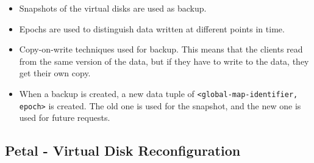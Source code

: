 \documentclass[parskip=half]{scrartcl}
\begin{document}
        \begin{itemize}
            \item 
            Snapshots of the virtual disks are used as backup.
            \item 
            Epochs are used to distinguish data written at different points in time.
            \item 
            Copy-on-write techniques used for backup. This means that the clients read from the same version of the data, but if they have to write to the data, they get their own copy.
            \item 
            When a backup is created, a new data tuple of \texttt{<global-map-identifier, epoch>} is created. The old one is used for the snapshot, and the new one is used for future requests.
        \end{itemize}
    

    \subsection{Petal - Virtual Disk Reconfiguration} %
    \label{sub:petal_virtual_disk_reconfiguration}
\end{document}

